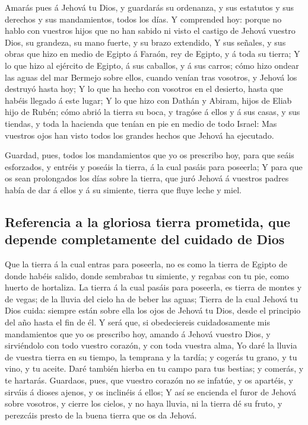  Amarás pues á Jehová tu Dios, y guardarás su ordenanza, y
sus estatutos y sus derechos y sus mandamientos, todos los días.
 Y comprended hoy: porque no hablo con vuestros hijos que no
han sabido ni visto el castigo de Jehová vuestro Dios, su grandeza, su
mano fuerte, y su brazo extendido,  Y sus señales, y sus
obras que hizo en medio de Egipto á Faraón, rey de Egipto, y á toda su
tierra;  Y lo que hizo al ejército de Egipto, á sus
caballos, y á sus carros; cómo hizo ondear las aguas del mar Bermejo
sobre ellos, cuando venían tras vosotros, y Jehová los destruyó hasta
hoy;  Y lo que ha hecho con vosotros en el desierto, hasta
que habéis llegado á este lugar;  Y lo que hizo con Dathán y
Abiram, hijos de Eliab hijo de Rubén; cómo abrió la tierra su boca, y
tragóse á ellos y á sus casas, y sus tiendas, y toda la hacienda que
tenían en pie en medio de todo Israel:  Mas vuestros ojos
han visto todos los grandes hechos que Jehová ha ejecutado.

 Guardad, pues, todos los mandamientos que yo os prescribo
hoy, para que seáis esforzados, y entréis y poseáis la tierra, á la cual
pasáis para poseerla;  Y para que os sean prolongados los
días sobre la tierra, que juró Jehová á vuestros padres había de dar á
ellos y á su simiente, tierra que fluye leche y miel.

\hypertarget{referencia-a-la-gloriosa-tierra-prometida-que-depende-completamente-del-cuidado-de-dios}{%
\subsection{Referencia a la gloriosa tierra prometida, que depende
completamente del cuidado de
Dios}\label{referencia-a-la-gloriosa-tierra-prometida-que-depende-completamente-del-cuidado-de-dios}}

 Que la tierra á la cual entras para poseerla, no es como
la tierra de Egipto de donde habéis salido, donde sembrabas tu simiente,
y regabas con tu pie, como huerto de hortaliza.  La tierra
á la cual pasáis para poseerla, es tierra de montes y de vegas; de la
lluvia del cielo ha de beber las aguas;  Tierra de la cual
Jehová tu Dios cuida: siempre están sobre ella los ojos de Jehová tu
Dios, desde el principio del año hasta el fin de él.  Y
será que, si obedeciereis cuidadosamente mis mandamientos que yo os
prescribo hoy, amando á Jehová vuestro Dios, y sirviéndolo con todo
vuestro corazón, y con toda vuestra alma,  Yo daré la
lluvia de vuestra tierra en su tiempo, la temprana y la tardía; y
cogerás tu grano, y tu vino, y tu aceite.  Daré también
hierba en tu campo para tus bestias; y comerás, y te hartarás.
 Guardaos, pues, que vuestro corazón no se infatúe, y os
apartéis, y sirváis á dioses ajenos, y os inclinéis á ellos;
 Y así se encienda el furor de Jehová sobre vosotros, y
cierre los cielos, y no haya lluvia, ni la tierra dé su fruto, y
perezcáis presto de la buena tierra que os da Jehová.

